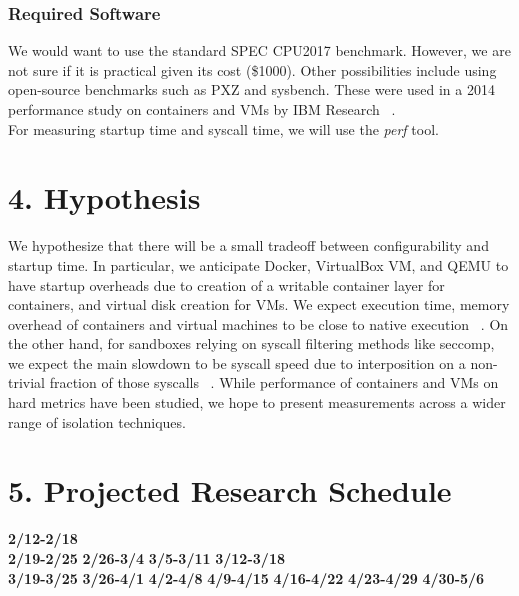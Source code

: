 \documentclass{proc}
\begin{document}
\subsubsection*{Required Software}
We would want to use the standard SPEC CPU2017 benchmark. However, we are not sure if it is practical given its cost (\$1000). Other possibilities include using open-source benchmarks such as PXZ and sysbench. These were used in a 2014 performance study on containers and VMs by IBM Research ~\cite{felter2014docker}.\\
For measuring startup time and syscall time, we will use the \emph{perf} tool.
\section*{4. Hypothesis}
We hypothesize that there will be a small tradeoff between configurability and startup time. In particular, we anticipate Docker, VirtualBox VM, and QEMU to have startup overheads due to creation of a writable container layer for containers, and virtual disk creation for VMs. We expect execution time, memory overhead of containers and virtual machines to be close to native execution ~\cite{felter2014docker}. On the other hand, for sandboxes relying on syscall filtering methods like seccomp, we expect the main slowdown to be syscall speed due to interposition on a non-trivial fraction of those syscalls ~\cite{kim2013mbox}. While performance of containers and VMs on hard metrics have been studied, we hope to present measurements across a wider range of isolation techniques.
\section*{5. Projected Research Schedule}
\textbf{2/12-2/18} \\
\textbf{2/19-2/25}
\textbf{2/26-3/4}
\textbf{3/5-3/11}
\textbf{3/12-3/18} \\
\textbf{3/19-3/25}
\textbf{3/26-4/1}
\textbf{4/2-4/8}
\textbf{4/9-4/15}
\textbf{4/16-4/22}
\textbf{4/23-4/29}
\textbf{4/30-5/6}






\end{document}
